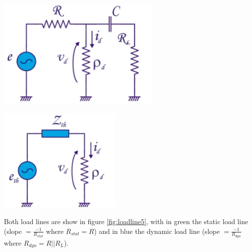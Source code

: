 \begin{minipage}{.5\textwidth}
	\centering
	\includegraphics[width=8cm]{figures/ch02/loadline3.jpg}
	\label{fig:loadline3}
\end{minipage}%
\begin{minipage}{.5\textwidth}
	\centering
	\includegraphics[width=6cm]{figures/ch02/loadline4.jpg}
	\label{fig:loadline4}
\end{minipage}

Both load lines are show in figure \ref{fig:loadline5}, with in green the static load line (slope $=\frac{-1}{R_{stat}}$ where $R_{stat} = R$) and in blue the dynamic load line (slope $=\frac{-1}{R_{dyn}}$ where $R_{dyn} = R || R_L$).\\

